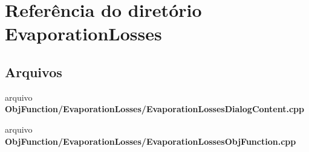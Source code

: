 \section{Referência do diretório Evaporation\+Losses}
\label{dir_d75dc2506082ce7ebbee181f5c878f28}
\subsection*{Arquivos}
\begin{DoxyCompactItemize}
\item 
arquivo {\bf Obj\+Function/\+Evaporation\+Losses/\+Evaporation\+Losses\+Dialog\+Content.\+cpp}
\item 
arquivo {\bf Obj\+Function/\+Evaporation\+Losses/\+Evaporation\+Losses\+Obj\+Function.\+cpp}
\end{DoxyCompactItemize}
